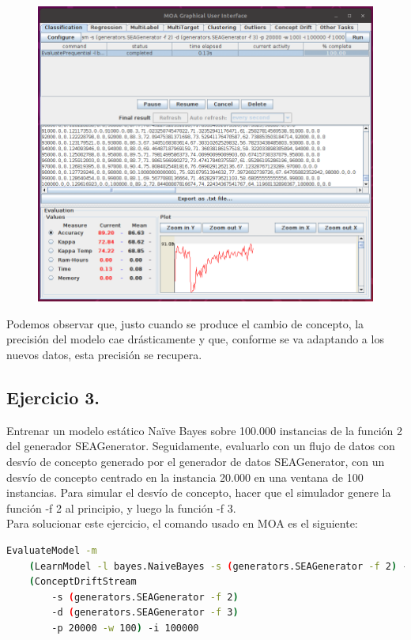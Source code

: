 \documentclass[11pt]{article}
\begin{document}
\begin{figure}[H]
	\includegraphics[width=\linewidth]{ejercicio2.png}
\end{figure}

Podemos observar que, justo cuando se produce el cambio de concepto, la precisión del modelo cae drásticamente y que, conforme se va adaptando a los nuevos datos, esta precisión se recupera.

\subsection{Ejercicio 3.}

Entrenar un modelo estático Na\"{i}ve Bayes sobre 100.000 instancias de la función 2 del generador SEAGenerator. Seguidamente, evaluarlo con un flujo de datos con desvío de concepto generado por el generador de datos SEAGenerator, con un desvío de concepto centrado en la instancia 20.000 en una ventana de 100 instancias. Para simular el desvío de concepto, hacer que el simulador genere la función -f 2 al principio, y luego la función -f 3. \\

Para solucionar este ejercicio, el comando usado en MOA es el siguiente:

\begin{lstlisting}[language=bash]
EvaluateModel -m
	(LearnModel -l bayes.NaiveBayes -s (generators.SEAGenerator -f 2) -m 100000) -s
	(ConceptDriftStream
		-s (generators.SEAGenerator -f 2)
		-d (generators.SEAGenerator -f 3)
		-p 20000 -w 100) -i 100000
\end{lstlisting}
\end{document}
